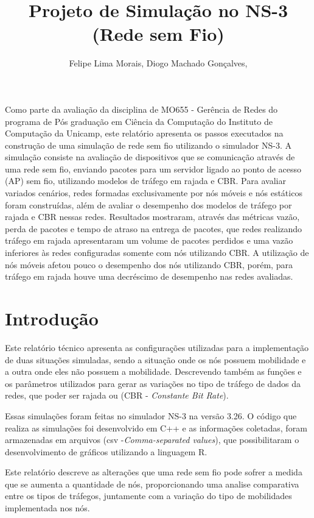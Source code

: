 \documentclass[12pt]{article}
\title{Projeto de Simulação no NS-3 (Rede sem Fio)}
\author{Felipe Lima Morais\inst{1}, Diogo Machado Gonçalves\inst{1},}
\begin{document}
 

\maketitle

\begin{resumo} 
Como parte da avaliação da disciplina de MO655 - Gerência de Redes do programa de Pós graduação em Ciência da Computação do Instituto de Computação da Unicamp, este relatório apresenta os passos executados na construção de uma simulação de rede sem fio utilizando o simulador NS-3. A simulação consiste na avaliação de dispositivos que se comunicação através de uma rede sem fio, enviando pacotes para um servidor ligado ao ponto de acesso (AP) sem fio, utilizando modelos de tráfego em rajada e CBR. Para avaliar variados cenários, redes formadas exclusivamente por nós móveis e nós estáticos foram construídas, além de avaliar o desempenho dos modelos de tráfego por rajada e CBR nessas redes. Resultados mostraram, através das métricas vazão, perda de pacotes e tempo de atraso na entrega de pacotes, que redes realizando tráfego em rajada apresentaram um volume de pacotes perdidos e uma vazão inferiores às redes configuradas somente com nós utilizando CBR. A utilização de nós móveis afetou pouco o desempenho dos nós utilizando CBR, porém, para tráfego em rajada houve uma decréscimo de desempenho nas redes avaliadas.
\end{resumo}

\section{Introdução}

Este relatório técnico apresenta as configurações utilizadas para a implementação de duas situações simuladas, sendo a situação onde os nós possuem mobilidade e a outra onde eles não possuem a mobilidade. Descrevendo também as funções e os parâmetros utilizados para gerar as variações no tipo de tráfego de dados da redes, que poder ser rajada ou (CBR - \textit{Constante Bit Rate}).

Essas simulações foram feitas no simulador NS-3 na versão 3.26. O código que realiza as simulações foi desenvolvido em C++ e as informações coletadas, foram armazenadas em arquivos (csv -\textit{Comma-separated values}), que possibilitaram o desenvolvimento de gráficos utilizando a linguagem R. 

Este relatório descreve as alterações que uma rede sem fio pode sofrer a medida que se aumenta a quantidade de nós, proporcionando uma analise comparativa entre os tipos de tráfegos, juntamente com a variação do tipo de mobilidades implementada nos nós. 
\end{document}
